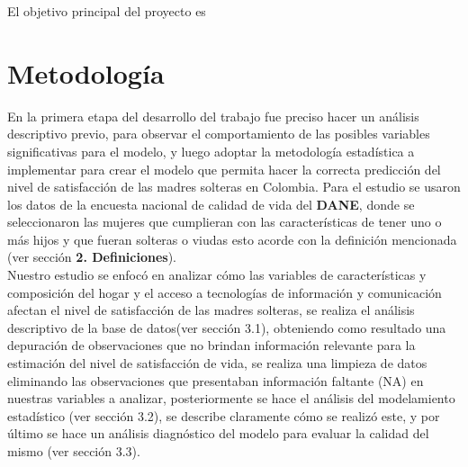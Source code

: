 \documentclass[11pt,twoside]{article}
\begin{document}


El objetivo principal del proyecto es 





\section{Metodología}
\noindent
En la primera etapa del desarrollo del trabajo fue preciso hacer un análisis descriptivo previo, para observar el comportamiento de las posibles variables significativas para el modelo, y luego adoptar la metodología estadística a implementar para crear el modelo que permita hacer la correcta predicción del nivel de satisfacción de las madres solteras en Colombia. Para el estudio se usaron los datos de la encuesta nacional de calidad de vida del \textbf{DANE}, donde se seleccionaron las mujeres que cumplieran con las características de tener uno o más hijos y que fueran solteras o viudas esto acorde con la definición mencionada (ver sección \textbf{2. Definiciones}).
\\
Nuestro estudio se enfocó en analizar cómo las variables de características y composición del hogar y el acceso a tecnologías de información y comunicación afectan el nivel  de satisfacción de las madres solteras, se  realiza el análisis descriptivo de la base de datos(ver sección 3.1), obteniendo como resultado una depuración de observaciones que no brindan información relevante para la estimación del nivel de satisfacción de vida, se realiza una limpieza de datos eliminando las observaciones que presentaban información faltante (NA) en nuestras variables a analizar, posteriormente se hace el análisis del modelamiento estadístico (ver sección 3.2), se describe claramente cómo se realizó este, y por último se hace un análisis diagnóstico del modelo para evaluar la calidad del mismo (ver sección 3.3).
\end{document}
